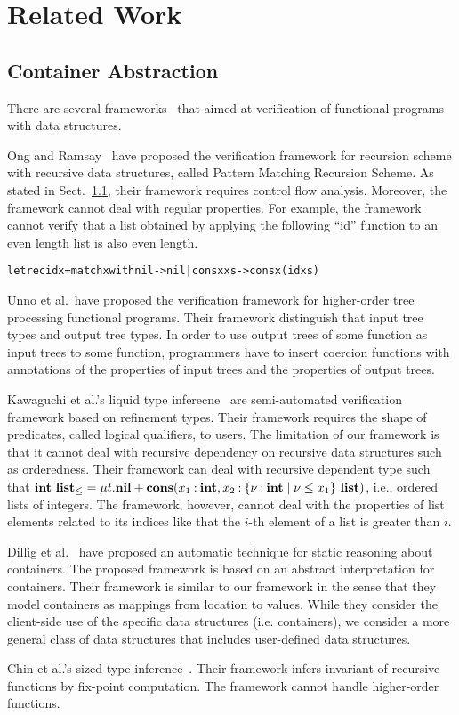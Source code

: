 \section{Related Work}
\label{sec:related}

\subsection{Container Abstraction}
There are several
frameworks~\cite{Kawaguchi2009,Chin2003,Unno2010,Ong2011} that aimed at
verification of functional programs with data structures.

Ong and Ramsay~\cite{Ong2011} have proposed the verification framework for recursion scheme with
recursive data structures, called Pattern Matching Recursion Scheme.  As stated in
Sect.~\ref{}, their framework requires control flow analysis. Moreover,
the framework cannot deal with regular properties. For example, the
framework cannot verify that a list obtained by applying the following
``id'' function to an even length list is also even length.
\begin{alltt}
let rec id x = match x with nil -> nil | cons x xs -> cons x (id xs)
\end{alltt}

Unno et al.~have proposed the verification framework for higher-order
tree processing functional programs. Their framework distinguish that
input tree types and output tree types.  In order to use output trees of
some function as input trees to some function, programmers have to
insert coercion functions with annotations of the properties of input
trees and the properties of output trees.

Kawaguchi et al.'s liquid type inferecne~\cite{Kawaguchi2009} are
semi-automated verification framework based on refinement types.  Their
framework requires the shape of predicates, called logical qualifiers,
to users.  The limitation of our framework is that it cannot deal with
recursive dependency on recursive data structures such as
orderedness.  Their framework can deal with recursive dependent type
such that ${\mathbf{int}}~{\mathbf{list}_\leq} = \mu t.\mathbf{nil} +
\mathbf{cons}({x_1\mathbin{:}\mathbf{int}},{x_2\mathbin{:}{\{\nu\mathbin{:}\mathbf{int} \mid \nu \leq
x_1\}}~{\mathbf{list}}})$, i.e., ordered lists of integers.  The framework,
however, cannot deal with the properties of list elements related to its
indices like that the $i$-th element of a list is greater than $i$.

Dillig et al.~\cite{Dillig2011} have proposed an automatic technique for
static reasoning about containers.  The proposed framework is based on
an abstract interpretation for containers.  Their framework is similar
to our framework in the sense that they model containers as mappings
from location to values.  While they consider the client-side use of the
specific data structures (i.e. containers), we consider a more general
class of data structures that includes user-defined data structures.

Chin et al.'s sized type inference~\cite{Chin2003}.  Their framework
infers invariant of recursive functions by fix-point computation.  The
framework cannot handle higher-order functions.

